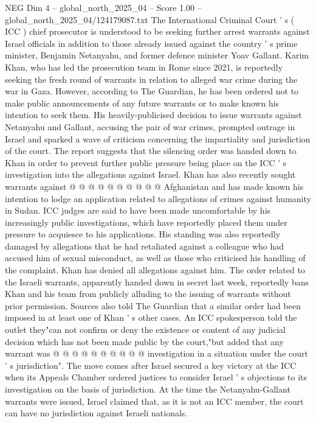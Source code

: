 \begin{textsample}{NEG Dim 4 – global\_north\_2025\_04 – Score 1.00 – global\_north\_2025\_04/124179087.txt}  \label{ex:f4_neg_235}
The International Criminal Court ' s ( ICC ) chief prosecutor is understood to be seeking further arrest warrants against Israel officials in addition to those already issued against the country ' s prime minister, Benjamin Netanyahu, and former defence minister Yoav Gallant.
Karim Khan, who has led the prosecution team in Rome since 2021, is reportedly seeking the fresh round of warrants in relation to alleged war crime during the war in Gaza.
However, according to The Guardian, he has been ordered not to make public announcements of any future warrants or to make known his intention to seek them.
His heavily-publicised decision to issue warrants against Netanyahu and Gallant, accusing the pair of war crimes, prompted outrage in Israel and sparked a wave of criticism concerning the impartiality and jurisdiction of the court.
The report suggests that the silencing order was handed down to Khan in order to prevent further public pressure being place on the ICC ' s investigation into the allegations against Israel.
Khan has also recently sought warrants against @ @ @ @ @ @ @ @ @ @ Afghanistan and has made known his intention to lodge an application related to allegations of crimes against humanity in Sudan.
ICC judges are said to have been made uncomfortable by his increasingly public investigations, which have reportedly placed them under pressure to acquiesce to his applications.
His standing was also reportedly damaged by allegations that he had retaliated against a colleague who had accused him of sexual misconduct, as well as those who criticised his handling of the complaint.
Khan has denied all allegations against him.
The order related to the Israeli warrants, apparently handed down in secret last week, reportedly bans Khan and his team from publicly alluding to the issuing of warrants without prior permission.
Sources also told The Guardian that a similar order had been imposed in at least one of Khan ' s other cases.
An ICC spokesperson told the outlet they"can not confirm or deny the existence or content of any judicial decision which has not been made public by the court,"but added that any warrant was @ @ @ @ @ @ @ @ @ @ investigation in a situation under the court ' s jurisdiction".
The move comes after Israel secured a key victory at the ICC when its Appeals Chamber ordered justices to consider Israel ' s objections to its investigation on the basis of jurisdiction.
At the time the Netanyahu-Gallant warrants were issued, Israel claimed that, as it is not an ICC member, the court can have no jurisdiction against Israeli nationals.

\end{textsample}
